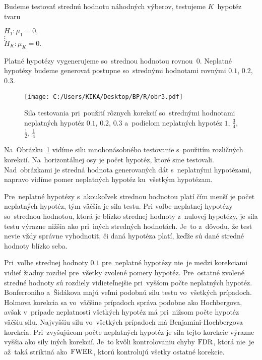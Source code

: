 Budeme testovať strednú hodnotu náhodných výberov, 
testujeme $K$~hypotéz tvaru 
\begin{center} 
  $ H_1: \mu_1 = 0, $ \\
  $ \vdots $ \\
  $ H_K: \mu_K = 0. $ \\
\end{center}
Platné hypotézy vygenerujeme so~strednou hodnotou rovnou~$0$. 
Neplatné hypotézy budeme generovať postupne so~strednými hodnotami rovnými $0.1$, $0.2$, $0.3$. 

\begin{figure}[h!]
  \centering
  \texttt{[image: C:/Users/KIKA/Desktop/BP/R/obr3.pdf]}
  \caption{Sila testovania pri~použití rôznych korekcií 
  so~strednými hodnotami neplatných hypotéz $0.1$, $0.2$, $0.3$ 
  a~podielom neplatných hypotéz ${1}$, $\frac{3}{4}$, $\frac{1}{2}$, $\frac{1}{4}$}
  \captionsetup{justification=centering}
  \label{obr04:1}
\end{figure}

Na~Obrázku~\ref{obr04:1} vidíme silu mnohonásobného testovanie s~použitím rozličných korekcií. 
Na~horizontálnej osy je počet hypotéz, ktoré sme testovali. 
Nad~obrázkami je stredná hodnota generovaných dát s~neplatnými hypotézami, 
napravo vidíme pomer neplatných hypotéz ku~všetkým hypotézam. 

Pre~neplatné hypotézy s~akoukoľvek strednou hodnotou platí
čím menší je počet neplatných hypotéz, tým väčšia je sila testu. 
Pri voľbe neplatnej hypotézy so~strednou hodnotou, ktorá je blízko strednej hodnoty z~nulovej hypotézy, 
je sila testu výrazne nižšia ako pri~iných stredných hodnotách. 
Je~to z~dôvodu, že test nevie vždy správne vyhodnotiť, či daná hypotéza platí, 
keďže sú dané stredné hodnoty blízko seba. 

Pri~voľbe strednej hodnoty $0.1$ pre~neplatné hypotézy nie~je medzi korekciami vidieť žiadny rozdiel 
pre~všetky zvolené pomery hypotéz. 
Pre~ostatné zvolené stredné hodnoty sú rozdiely vidieteľnejšie pri~vyššom počte neplatných hypotéz. 
Bonferroniho a~Šidákova majú veľmi podobnú silu testu vo~všetkých prípadoch. 
Holmova korekcia sa vo~väčšine prípadoch správa podobne ako Hochbergova, 
avšak v~prípade neplatnosti všetkých hypotéz má pri~nižsom počte hypotéz väčšiu silu. 
Najvyššiu silu vo~všetkých prípadoch má Benjamini-Hochbergova korekcia. 
Pri~zvyšujúcom počte neplatných hypotéz je sila tejto korekcie výrazne vyššia ako sily iných korekcií. 
Je~to kvôli kontrolovaniu chyby ${\rm FDR}$, ktorá nie~je až~taká striktná ako~${\rm FWER}$, 
ktorú kontrolujú všetky ostatné korekcie.

